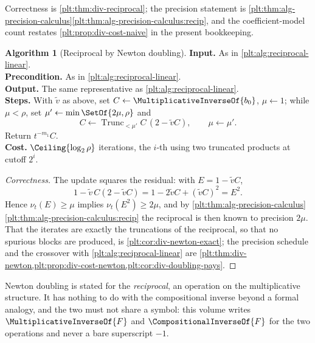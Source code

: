 \documentclass[11pt,oneside]{article}
\theoremstyle{plain}
\theoremstyle{definition}
\newtheorem{algorithm}[theorem]{Algorithm}
\theoremstyle{remark}
\newcommand{\ordt}{\nu_{t}}                              %
\newcommand{\Trunc}[2]{\operatorname{Trunc}_{<#2}#1}     %
\newcommand{\rev}[1]{\CompositionalInverseOf{#1}}
\begin{document}
Correctness is \cref{plt:thm:div-reciprocal}; the precision statement is
\cref{plt:thm:alg-precision-calculus}\ref{plt:thm:alg-precision-calculus:recip},
and the coefficient-model count restates \cref{plt:prop:div-cost-naive} in the
present bookkeeping.

\begin{algorithm}[Reciprocal by Newton doubling]\label{plt:alg:reciprocal-newton}
\textbf{Input.}  As in \cref{plt:alg:reciprocal-linear}.\\
\textbf{Precondition.}  As in \cref{plt:alg:reciprocal-linear}.\\
\textbf{Output.}  The same representative as \cref{plt:alg:reciprocal-linear}.\\
\textbf{Steps.}  With \(\widetilde v\) as above, set
\(C\leftarrow\MultiplicativeInverseOf{b_0}\), \(\mu\leftarrow1\); while
\(\mu<\rho\), set \(\mu'\leftarrow\min\SetOf{2\mu,\rho}\) and
\[
 C\leftarrow\Trunc{C\,(2-\widetilde vC)}{\mu'},
 \qquad \mu\leftarrow\mu' .
\]
Return \(t^{-m_1}C\).\\
\textbf{Cost.}  \(\Ceiling{\log_2\rho}\) iterations, the \(i\)-th using two
truncated products at cutoff \(2^i\).
\end{algorithm}

\begin{proof}[Correctness]
The update squares the residual: with \(E=1-\widetilde vC\),
\[
 1-\widetilde v\,C(2-\widetilde vC)
 =1-2\widetilde vC+(\widetilde vC)^2=E^2 .
\]
Hence \(\ordt(E)\ge\mu\) implies \(\ordt(E^2)\ge2\mu\), and by
\cref{plt:thm:alg-precision-calculus}\ref{plt:thm:alg-precision-calculus:recip}
the reciprocal is then known to precision \(2\mu\).  That the iterates are
exactly the truncations of the reciprocal, so that no spurious blocks are
produced, is \cref{plt:cor:div-newton-exact}; the precision schedule and the
crossover with \cref{plt:alg:reciprocal-linear} are
\cref{plt:thm:div-newton,plt:prop:div-cost-newton,plt:cor:div-doubling-pays}.
\end{proof}

\begin{warningbox}
Newton doubling is stated for the \emph{reciprocal}, an operation on the
multiplicative structure.  It has nothing to do with the compositional inverse
beyond a formal analogy, and the two must not share a symbol: this volume
writes \(\MultiplicativeInverseOf{F}\) and \(\rev{F}\) for the two operations
and never a bare superscript \(-1\).
\end{warningbox}
\end{document}
